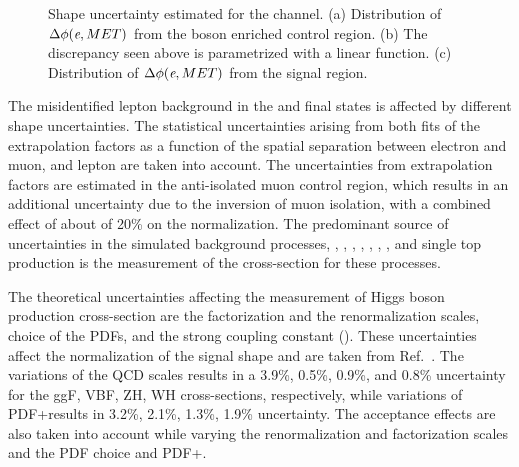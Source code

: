 \begin{figure}[htbp]
{  }
  \caption{Shape uncertainty estimated for the \Hehad channel. (a) Distribution of $\Delta\phi(\textit{e}, MET)$ from the \PW boson enriched control region. (b) The discrepancy seen above is parametrized with a linear function. (c) Distribution of $\Delta\phi(\textit{e}, MET)$ from the signal region.}
  \label{fig:etauh_systematics}
\end{figure}

The misidentified lepton background in the \emu and \mue final states is affected by different shape uncertainties. The statistical uncertainties arising from both fits of the extrapolation factors as a function of the spatial separation between electron and muon, and lepton \pt are taken into account. The uncertainties from extrapolation factors are estimated in the anti-isolated muon control region, which results in an additional uncertainty due to the inversion of muon isolation, with a combined effect of about of 20\% on the normalization.  The predominant source of uncertainties in the simulated background processes, \Zee, \Zmm, \Ztt, \PW{}\PW, \PZ{}\PZ, \PW{}\Pgg, \ttbar, and single top production is the measurement of the cross-section for these processes.

The theoretical uncertainties affecting the measurement of Higgs boson production cross-section are the factorization and the renormalization scales, choice of the PDFs, and the strong coupling constant (\as). These uncertainties affect the normalization of the signal shape and are taken from Ref.~\cite{deFlorian:2016spz}. The variations of the QCD scales results in a 3.9\%, 0.5\%, 0.9\%, and 0.8\% uncertainty for the ggF, VBF, ZH, WH cross-sections, respectively, while variations of PDF+\as results in 3.2\%, 2.1\%, 1.3\%, 1.9\% uncertainty. The acceptance effects are also taken into account while varying the renormalization and factorization scales and the PDF choice and PDF+\as.

